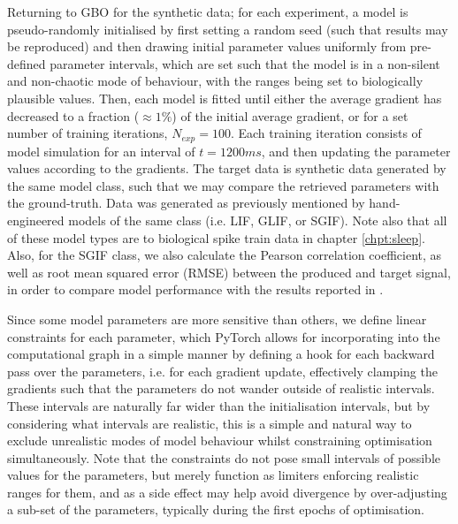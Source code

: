 \documentclass[mphil,deptreport,ianc]{infthesis} %
\begin{document}
Returning to GBO for the synthetic data; for each experiment, a model is pseudo-randomly initialised by first setting a random seed (such that results may be reproduced) and then drawing initial parameter values uniformly from pre-defined parameter intervals, which are set such that the model is in a non-silent and non-chaotic mode of behaviour, with the ranges being set to biologically plausible values.
Then, each model is fitted until either the average gradient has decreased to a fraction ($\approx 1 \%$) of the initial average gradient, or for a set number of training iterations, $N_{exp}=100$.
Each training iteration consists of model simulation for an interval of $t=1200 \si{ms}$, and then updating the parameter values according to the gradients.
The target data is synthetic data generated by the same model class, such that we may compare the retrieved parameters with the ground-truth.
Data was generated as previously mentioned by hand-engineered models of the same class (i.e. LIF, GLIF, or SGIF).
Note also that all of these model types are to biological spike train data in chapter \ref{chpt:sleep}.
Also, for the SGIF class, we also calculate the Pearson correlation coefficient, as well as root mean squared error (RMSE) between the produced and target signal, in order to compare model performance with the results reported in \cite{Rene2020}.

Since some model parameters are more sensitive than others, we define linear constraints for each parameter, which PyTorch allows for incorporating into the computational graph in a simple manner by defining a hook for each backward pass over the parameters, i.e. for each gradient update, effectively clamping the gradients such that the parameters do not wander outside of realistic intervals. 
These intervals are naturally far wider than the initialisation intervals, but by considering what intervals are realistic, this is a simple and natural way to exclude unrealistic modes of model behaviour whilst constraining optimisation simultaneously.
Note that the constraints do not pose small intervals of possible values for the parameters, but merely function as limiters enforcing realistic ranges for them, and as a side effect may help avoid divergence by over-adjusting a sub-set of the parameters, typically during the first epochs of optimisation.

\end{document}

